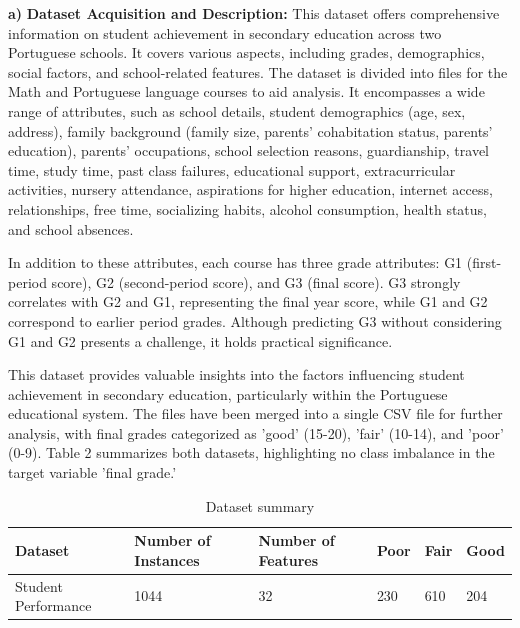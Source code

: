 \documentclass[conference]{IEEEtran}
\begin{document}
\textbf{a)} \textbf{Dataset Acquisition and Description:} 
This dataset offers comprehensive information on student achievement in secondary education across two Portuguese schools. It covers various aspects, including grades, demographics, social factors, and school-related features. The dataset is divided into files for the Math and Portuguese language courses to aid analysis. It encompasses a wide range of attributes, such as school details, student demographics (age, sex, address), family background (family size, parents' cohabitation status, parents' education), parents' occupations, school selection reasons, guardianship, travel time, study time, past class failures, educational support, extracurricular activities, nursery attendance, aspirations for higher education, internet access, relationships, free time, socializing habits, alcohol consumption, health status, and school absences.\par
In addition to these attributes, each course has three grade attributes: G1 (first-period score), G2 (second-period score), and G3 (final score). G3 strongly correlates with G2 and G1, representing the final year score, while G1 and G2 correspond to earlier period grades. Although predicting G3 without considering G1 and G2 presents a challenge, it holds practical significance.\par
This dataset provides valuable insights into the factors influencing student achievement in secondary education, particularly within the Portuguese educational system. The files have been merged into a single CSV file for further analysis, with final grades categorized as 'good' (15-20), 'fair' (10-14), and 'poor' (0-9). Table 2 summarizes both datasets, highlighting no class imbalance in the target variable 'final grade.'

\FloatBarrier
\begin{table}[hbt!]
\label{table2}
\centering
\caption{Dataset summary}
\begin{tabular}{|p{1cm}|p{1cm}|p{1cm}|p{1cm}|p{1cm}|p{1cm}| }
\hline
Dataset & Number of Instances & Number of Features& Poor & Fair & Good\\ \hline
Student Performance & 1044 & 32 & 230 & 610 & 204 \\ \hline 
\end{tabular}
\end{table}
\end{document}
